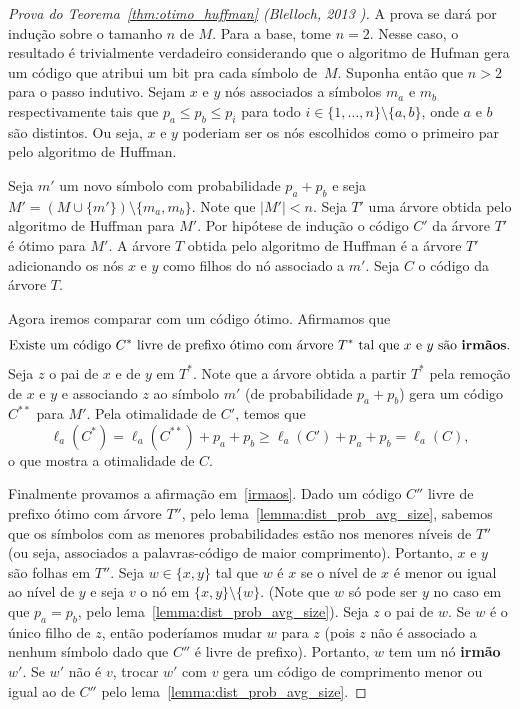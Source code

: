 \begin{proof}[Prova do Teorema~\ref{thm:otimo_huffman} (Blelloch, 2013 \cite{Ble})]
A prova se dará por indução sobre o tamanho $n$ de $M$. Para a base,
tome $n=2$. Nesse caso, o resultado é trivialmente verdadeiro
considerando que o algoritmo de Hufman gera um código que atribui um
bit pra cada símbolo de~$M$. Suponha então que $n>2$ para o passo
indutivo. Sejam $x$ e $y$ nós associados a símbolos $m_a$ e $m_b$
respectivamente tais que $p_a \leq p_b \leq p_i$ para todo $i \in
\{1,\dotsc,n\}\setminus\{a,b\}$, onde $a$ e $b$ são distintos. Ou seja, $x$ e $y$ poderiam ser os nós escolhidos como o primeiro par pelo algoritmo de Huffman.

Seja $m'$ um novo símbolo com probabilidade $p_a+p_b$ e seja $M' =
(M\cup\{m'\})\setminus\{m_a, m_b\}$. Note que $|M'| < n$. Seja $T'$
uma árvore obtida pelo algoritmo de Huffman para $M'$. Por hipótese de
indução o código $C'$ da árvore $T'$ é ótimo para $M'$. A árvore $T$
obtida pelo algoritmo de Huffman é a árvore $T'$ adicionando os nós
$x$ e $y$ como filhos do nó associado a $m'$. Seja $C$ o código da
árvore $T$.

Agora iremos comparar com um código ótimo. Afirmamos que
\begin{equation}
 \label{irmaos}
\text{Existe um código $C^*$ livre de prefixo ótimo com árvore $T^*$
  tal que $x$ e $y$ são \textbf{irmãos}.}
\end{equation}
Seja $z$ o pai de $x$ e de $y$ em $T^*$. Note que a árvore obtida a
partir $T^*$ pela remoção de $x$ e $y$ e associando $z$ ao símbolo
$m'$ (de probabilidade $p_a+p_b$) gera um código $C^{**}$ para $M'$. Pela
otimalidade de $C'$, temos que
\begin{equation*}
  \ell_a(C^*)
  =
   \ell_a(C^{**})+p_a+p_b
  \geq
  \ell_a(C')+p_a+p_b
  =
  \ell_a(C),
\end{equation*}
o que mostra a otimalidade de $C$.


Finalmente provamos a afirmação em~\eqref{irmaos}.  Dado um código
$C''$ livre de prefixo ótimo com árvore $T''$, pelo
lema~\ref{lemma:dist_prob_avg_size}, sabemos que os símbolos com as
menores probabilidades estão nos menores níveis de $T''$ (ou seja,
associados a palavras-código de maior comprimento). Portanto, $x$ e
$y$ são folhas em $T''$. Seja $w \in\{x,y\}$ tal que $w$ é $x$ se o
nível de $x$ é menor ou igual ao nível de $y$ e seja $v$ o nó em
$\{x,y\}\setminus\{w\}$. (Note que $w$ só pode ser $y$ no caso em que
$p_a = p_b$, pelo lema~\ref{lemma:dist_prob_avg_size}). Seja $z$ o pai
de $w$. Se $w$ é o único filho de $z$, então poderíamos mudar $w$ para
$z$ (pois $z$ não é associado a nenhum símbolo dado que $C''$ é livre
de prefixo). Portanto, $w$ tem um nó \textbf{irmão} $w'$. Se $w'$ não
é $v$, trocar $w'$ com $v$ gera um código de comprimento menor ou
igual ao de $C''$ pelo lema~\ref{lemma:dist_prob_avg_size}. 
\end{proof}

